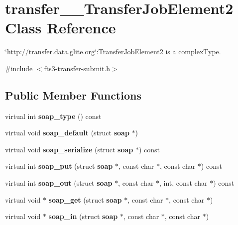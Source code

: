 \section{transfer\_\-\_\-TransferJobElement2 Class Reference}
\label{classtransfer____TransferJobElement2}


\char`\"{}http://transfer.data.glite.org\char`\"{}:TransferJobElement2 is a complexType.  




{\ttfamily \#include $<$fts3-\/transfer-\/submit.h$>$}

\subsection*{Public Member Functions}
\begin{DoxyCompactItemize}
\item 
virtual int {\bfseries soap\_\-type} () const \label{classtransfer____TransferJobElement2_a77faf0214629f9949c7e11b8e72cc278}

\item 
virtual void {\bfseries soap\_\-default} (struct {\bf soap} $\ast$)\label{classtransfer____TransferJobElement2_a2ee361c3004e9761da2e2a4bedd842b6}

\item 
virtual void {\bfseries soap\_\-serialize} (struct {\bf soap} $\ast$) const \label{classtransfer____TransferJobElement2_abf0c019c9ab22f3086f00c14adac9b26}

\item 
virtual int {\bfseries soap\_\-put} (struct {\bf soap} $\ast$, const char $\ast$, const char $\ast$) const \label{classtransfer____TransferJobElement2_a04d8d08eaf15b2bb01ed2c5d79a709fd}

\item 
virtual int {\bfseries soap\_\-out} (struct {\bf soap} $\ast$, const char $\ast$, int, const char $\ast$) const \label{classtransfer____TransferJobElement2_a457c25419762ac72252a9315eea934a7}

\item 
virtual void $\ast$ {\bfseries soap\_\-get} (struct {\bf soap} $\ast$, const char $\ast$, const char $\ast$)\label{classtransfer____TransferJobElement2_a4cbab712b1ccae7f45bb652c86b6b80f}

\item 
virtual void $\ast$ {\bfseries soap\_\-in} (struct {\bf soap} $\ast$, const char $\ast$, const char $\ast$)\label{classtransfer____TransferJobElement2_ae53dcbc7ed7f19c99afe80b1a2d6830d}

\end{DoxyCompactItemize}
